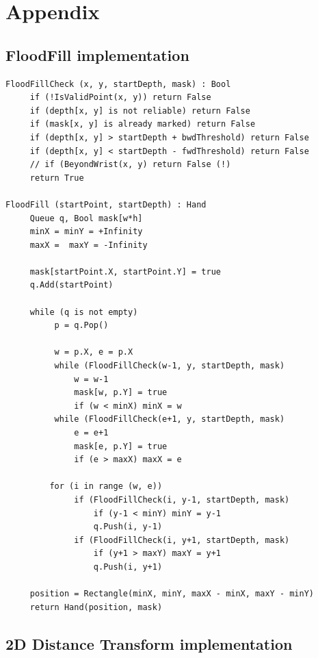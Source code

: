 \documentclass[a4paper,11pt,oneside]{article}
\begin{document}
 \newpage

\section{Appendix}

\subsection{FloodFill implementation}

\begin{verbatim}
FloodFillCheck (x, y, startDepth, mask) : Bool
     if (!IsValidPoint(x, y)) return False
     if (depth[x, y] is not reliable) return False
     if (mask[x, y] is already marked) return False
     if (depth[x, y] > startDepth + bwdThreshold) return False
     if (depth[x, y] < startDepth - fwdThreshold) return False
     // if (BeyondWrist(x, y) return False (!)
     return True

FloodFill (startPoint, startDepth) : Hand
     Queue q, Bool mask[w*h]
     minX = minY = +Infinity
     maxX =  maxY = -Infinity

     mask[startPoint.X, startPoint.Y] = true
     q.Add(startPoint)

     while (q is not empty)
          p = q.Pop()

          w = p.X, e = p.X
          while (FloodFillCheck(w-1, y, startDepth, mask)
              w = w-1
              mask[w, p.Y] = true
              if (w < minX) minX = w
          while (FloodFillCheck(e+1, y, startDepth, mask)
              e = e+1
              mask[e, p.Y] = true
              if (e > maxX) maxX = e

         for (i in range (w, e)) 
              if (FloodFillCheck(i, y-1, startDepth, mask)
                  if (y-1 < minY) minY = y-1
                  q.Push(i, y-1)
              if (FloodFillCheck(i, y+1, startDepth, mask)
                  if (y+1 > maxY) maxY = y+1
                  q.Push(i, y+1)
     
     position = Rectangle(minX, minY, maxX - minX, maxY - minY)
     return Hand(position, mask)

\end{verbatim}


\newpage
\subsection{2D Distance Transform implementation}
\end{document}
